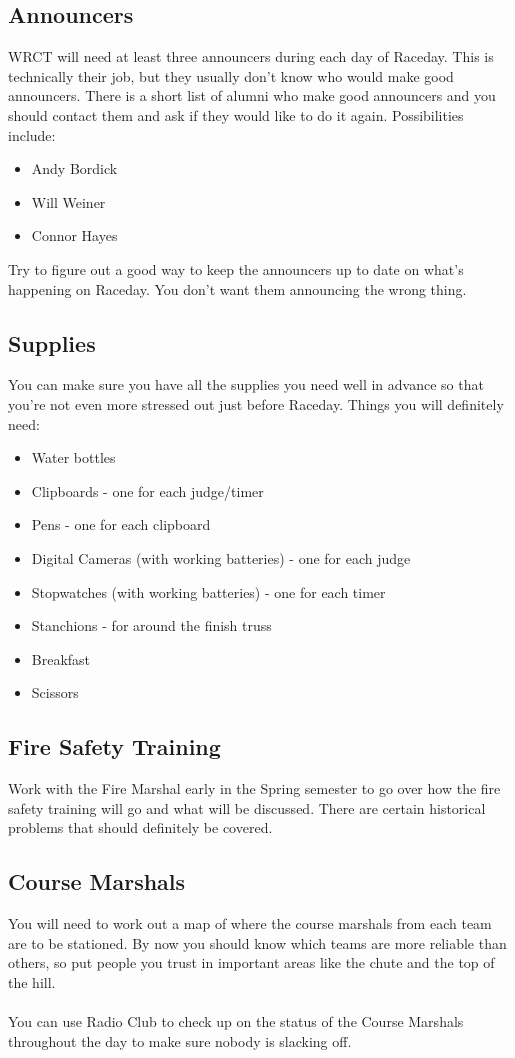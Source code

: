 \subsection{Announcers}
WRCT will need at least three announcers during each day of Raceday. This
is technically their job, but they usually don't know who would make good
announcers. There is a short list of alumni who make good announcers and you
should contact them and ask if they would like to do it again. Possibilities
include:
\begin{itemize}
\item Andy Bordick
\item Will Weiner
\item Connor Hayes
\end{itemize}

Try to figure out a good way to keep the announcers up to date on what's
happening on Raceday. You don't want them announcing the wrong thing.

\subsection{Supplies}
You can make sure you have all the supplies you need well in advance
so that you're not even more stressed out just before Raceday. Things
you will definitely need:
\begin{itemize}
\item Water bottles
\item Clipboards - one for each judge/timer
\item Pens - one for each clipboard
\item Digital Cameras (with working batteries) - one for each judge
\item Stopwatches (with working batteries) - one for each timer
\item Stanchions - for around the finish truss
\item Breakfast
\item Scissors
\end{itemize}

\subsection{Fire Safety Training}
Work with the Fire Marshal early in the Spring semester to go over how the
fire safety training will go and what will be discussed. There are certain
historical problems that should definitely be covered.

\subsection{Course Marshals}
You will need to work out a map of where the course marshals from each team
are to be stationed. By now you should know which teams are more reliable
than others, so put people you trust in important areas like the chute and
the top of the hill.
\\\\
You can use Radio Club to check up on the status of the Course Marshals
throughout the day to make sure nobody is slacking off.

